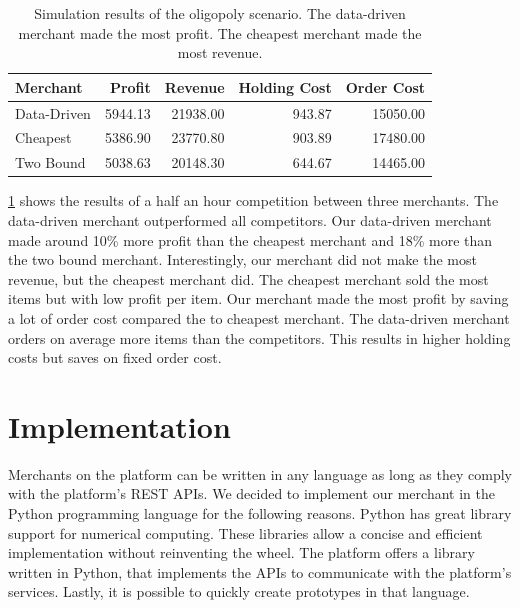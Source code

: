 \begin{table}[t]
	\centering
	\begin{tabular}{lrrrr}
		\toprule
		Merchant & Profit & Revenue & Holding Cost & Order Cost \\
		\midrule
		Data-Driven & 5944.13 & 21938.00 & 943.87 & 15050.00 \\
		Cheapest & 5386.90 & 23770.80 & 903.89 & 17480.00 \\
		Two Bound & 5038.63 & 20148.30 & 644.67 & 14465.00 \\
		\bottomrule
	\end{tabular}
	\caption{Simulation results of the oligopoly scenario. The data-driven merchant made the most profit. The cheapest merchant made the most revenue.}
	\label{tab:competition}
\end{table}

\cref{tab:competition} shows the results of a half an hour competition between three merchants.
The data-driven merchant outperformed all competitors.
Our data-driven merchant made around 10\% more profit than the cheapest merchant and 18\% more than the two bound merchant.
Interestingly, our merchant did not make the most revenue, but the cheapest merchant did.
The cheapest merchant sold the most items but with low profit per item.
Our merchant made the most profit by saving a lot of order cost compared the to cheapest merchant.
The data-driven merchant orders on average more items than the competitors.
This results in higher holding costs but saves on fixed order cost.


%

\section{Implementation}
Merchants on the \pricewars platform can be written in any language as long as they comply with the platform's REST APIs.
We decided to implement our merchant in the Python programming language for the following reasons.
Python has great library support for numerical computing.
These libraries allow a concise and efficient implementation without reinventing the wheel.
The \pricewars platform offers a library written in Python, that implements the APIs to communicate with the platform's services.
Lastly, it is possible to quickly create prototypes in that language.

